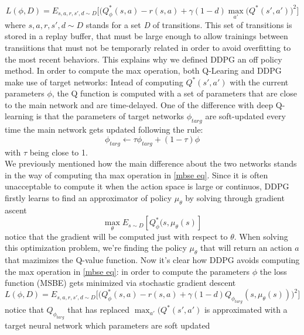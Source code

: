 \documentclass[a4paper]{report}
\begin{document}
\begin{equation} \label{mbse eq}
L(\phi, \textit{D}) = E_{s,a,r,s',d \sim \textit{D}}\biggl[\bigl(Q_{\phi}^{*}(s,a) - r(s,a) + \gamma(1-d)  \max_{a'}(Q^*(s',a')
\bigr)^2
\biggr]
\end{equation}
where $s,a,r,s',d \sim \textit{D}$ stands for a set \textit{D} of transitions. This set of transitions is stored in a replay buffer, that must be large enough to allow trainings between transiitions that must not be temporarly related in order to avoid overfitting to the most recent behaviors. This explains why we defined DDPG an off policy method. In order to compute the max operation, both Q-Learing and DDPG make use of target networks: Intead of computing $Q^*(s',a')$ with the current parameters $\phi$, the Q function is computed with a set of parameters that are close to the main network and are time-delayed. One of the difference with deep Q-learning is that the parameters of target networks $\phi_{targ} $ are soft-updated every time the main network gets updated following the rule:
\begin{equation} \label{soft update rule}
\phi_{targ} \leftarrow \tau \phi_{targ} + (1- \tau) \phi
\end{equation}
with $\tau$ being close to 1.\\
We previously mentioned how the main difference about the two networks stands in the way of computing tha max operation in \ref{mbse eq}. Since it is often unacceptable to compute it when the action space is large or continuos, DDPG firstly learns to find an approximator of policy $\mu_{\theta}$ by solving through gradient ascent
\begin{equation}
\max_{\theta}E_{s \sim D}[Q_{\phi}^*(s,\mu_{\theta}(s)]
\end{equation}
notice that the gradient will be computed just with respect to $\theta$. When solving this optimization problem, we're finding the policy $\mu_{\theta}$ that will return an action $a$ that mazimizes the Q-value function. Now it's clear how DDPG avoids computing the max operation in \ref{mbse eq}: in order to compute the parameters $\phi$ the loss function (MSBE) gets minimized via stochastic gradient descent
\begin{equation}
L(\phi, \textit{D}) = E_{s,a,r,s',d \sim \textit{D}}\biggl[\bigl(Q_{\phi}^{*}(s,a) - r(s,a) + \gamma(1-d) Q_{\phi_{targ}}(s, \mu_{\theta}(s))
\bigr)^2
\biggr]
\end{equation}
notice that $Q_{\phi_{targ}}$ that has replaced $ \max_{a'}(Q^*(s',a')$ is approximated with a target neural network which parameters are soft updated 
\end{document}
